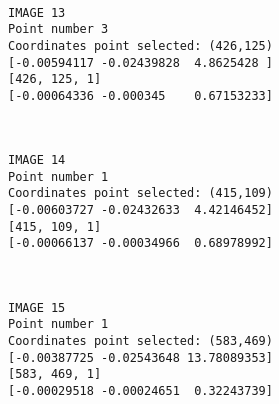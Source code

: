\documentclass[11pt]{article}
\begin{document}
    \begin{center}
    \end{center}
    { \hspace*{\fill} \\}
    
    \begin{Verbatim}[commandchars=\\\{\}]
IMAGE 13
Point number 3
Coordinates point selected: (426,125)
[-0.00594117 -0.02439828  4.8625428 ]
[426, 125, 1]
[-0.00064336 -0.000345    0.67153233]

    \end{Verbatim}

    \begin{center}
    \end{center}
    { \hspace*{\fill} \\}
    
    \begin{Verbatim}[commandchars=\\\{\}]
IMAGE 14
Point number 1
Coordinates point selected: (415,109)
[-0.00603727 -0.02432633  4.42146452]
[415, 109, 1]
[-0.00066137 -0.00034966  0.68978992]

    \end{Verbatim}

    \begin{center}
    \end{center}
    { \hspace*{\fill} \\}
    
    \begin{Verbatim}[commandchars=\\\{\}]
IMAGE 15
Point number 1
Coordinates point selected: (583,469)
[-0.00387725 -0.02543648 13.78089353]
[583, 469, 1]
[-0.00029518 -0.00024651  0.32243739]

    \end{Verbatim}

    \begin{center}
    \end{center}
    { \hspace*{\fill} \\}
    
\end{document}
